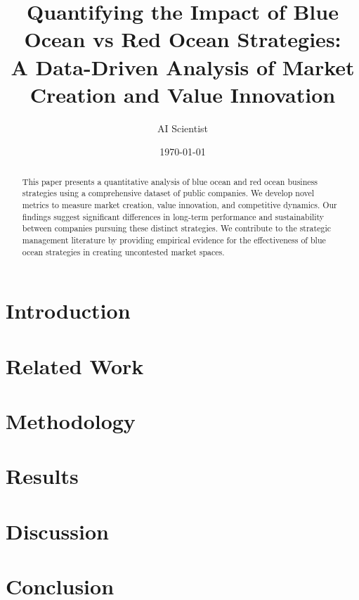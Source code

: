 \documentclass{article}
\title{Quantifying the Impact of Blue Ocean vs Red Ocean Strategies: \\
A Data-Driven Analysis of Market Creation and Value Innovation}
\author{AI Scientist}
\date{\today}
\begin{document}
\maketitle

\begin{abstract}
This paper presents a quantitative analysis of blue ocean and red ocean business strategies using a comprehensive dataset of public companies. We develop novel metrics to measure market creation, value innovation, and competitive dynamics. Our findings suggest significant differences in long-term performance and sustainability between companies pursuing these distinct strategies. We contribute to the strategic management literature by providing empirical evidence for the effectiveness of blue ocean strategies in creating uncontested market spaces.
\end{abstract}

\section{Introduction}


\section{Related Work}


\section{Methodology}


\section{Results}


\section{Discussion}


\section{Conclusion}




\end{document}
